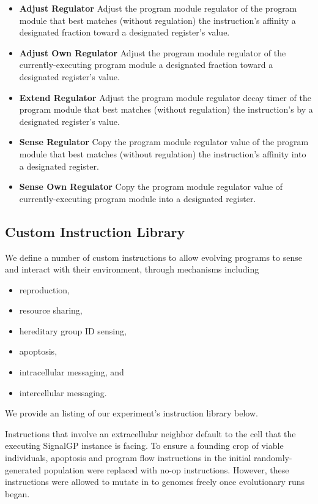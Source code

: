 \begin{itemize}
\item \textbf{Adjust Regulator}
Adjust the program module regulator of the program module that best matches (without regulation) the instruction's affinity a designated fraction toward a designated register's value.
\item \textbf{Adjust Own Regulator}
Adjust the program module regulator of the currently-executing program module a designated fraction toward a designated register's value.
\item \textbf{Extend Regulator}
Adjust the program module regulator decay timer of the program module that best matches (without regulation) the instruction's by a designated register's value.
\item \textbf{Sense Regulator}
Copy the program module regulator value of the program module that best matches (without regulation) the instruction's affinity into a designated register.
\item \textbf{Sense Own Regulator}
Copy the program module regulator value of currently-executing program module into a designated register.
\end{itemize}

\subsection{Custom Instruction Library} \label{sup:custom_instruction_library}

We define a number of custom instructions to allow evolving programs to sense and interact with their environment, through mechanisms including
\begin{itemize}
\item reproduction,
\item resource sharing,
\item hereditary group ID sensing,
\item apoptosis,
\item intracellular messaging, and
\item intercellular messaging.
\end{itemize}

We provide an listing of our experiment's instruction library below.

Instructions that involve an extracellular neighbor default to the cell that the executing SignalGP instance is facing.
To ensure a founding crop of viable individuals, apoptosis and program flow instructions in the initial randomly-generated population were replaced with no-op instructions.
However, these instructions were allowed to mutate in to genomes freely once evolutionary runs began.

